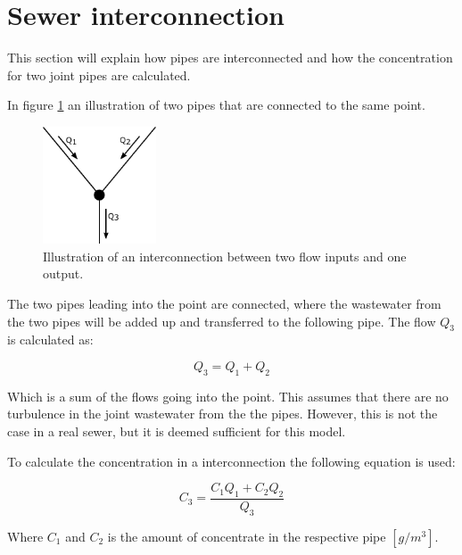 \section{Sewer interconnection}\label{se:sewer_interconnection}
This section will explain how pipes are interconnected and how the concentration for two joint pipes are calculated.

In figure \ref{fig:interconnections} an illustration of two pipes that are connected to the same point.

\begin{figure}[H]
\centering
\includegraphics[width=0.30\textwidth]{report/modeling/pictures/interconnections}
\caption{Illustration of an interconnection between two flow inputs and one output.}
\label{fig:interconnections}
\end{figure} 

The two pipes leading into the point are connected, where the wastewater from the two pipes will be added up and transferred to the following pipe. The flow $Q_3$ is calculated as:

\begin{equation}
	\boxed{Q_3 = Q_1 + Q_2}
\end{equation} 

Which is a sum of the flows going into the point. This assumes that there are no turbulence in the joint wastewater from the the pipes. However, this is not the case in a real sewer, but it is deemed sufficient for this model. 

To calculate the concentration in a interconnection the following equation is used: %

\begin{equation}\label{poop_addition_interconnection}
	\boxed{C_3 = \frac{C_1 Q_1 + C_2 Q_2}{Q_3}}
\end{equation}

Where $C_1$ and $C_2$ is the amount of concentrate in the respective pipe $\left[g /m^3 \right]$. 


